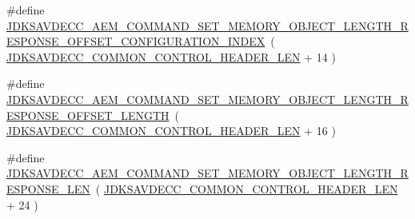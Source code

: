 \begin{DoxyCompactItemize}
\item 
\#define \hyperlink{group__command__set__memory__object__length__response_gaa06198d399f215f4a7f273be83b41e16}{J\+D\+K\+S\+A\+V\+D\+E\+C\+C\+\_\+\+A\+E\+M\+\_\+\+C\+O\+M\+M\+A\+N\+D\+\_\+\+S\+E\+T\+\_\+\+M\+E\+M\+O\+R\+Y\+\_\+\+O\+B\+J\+E\+C\+T\+\_\+\+L\+E\+N\+G\+T\+H\+\_\+\+R\+E\+S\+P\+O\+N\+S\+E\+\_\+\+O\+F\+F\+S\+E\+T\+\_\+\+C\+O\+N\+F\+I\+G\+U\+R\+A\+T\+I\+O\+N\+\_\+\+I\+N\+D\+EX}~( \hyperlink{group__jdksavdecc__avtp__common__control__header_gaae84052886fb1bb42f3bc5f85b741dff}{J\+D\+K\+S\+A\+V\+D\+E\+C\+C\+\_\+\+C\+O\+M\+M\+O\+N\+\_\+\+C\+O\+N\+T\+R\+O\+L\+\_\+\+H\+E\+A\+D\+E\+R\+\_\+\+L\+EN} + 14 )
\item 
\#define \hyperlink{group__command__set__memory__object__length__response_ga0b1a77e125f9bb1d16b576adb8bc8021}{J\+D\+K\+S\+A\+V\+D\+E\+C\+C\+\_\+\+A\+E\+M\+\_\+\+C\+O\+M\+M\+A\+N\+D\+\_\+\+S\+E\+T\+\_\+\+M\+E\+M\+O\+R\+Y\+\_\+\+O\+B\+J\+E\+C\+T\+\_\+\+L\+E\+N\+G\+T\+H\+\_\+\+R\+E\+S\+P\+O\+N\+S\+E\+\_\+\+O\+F\+F\+S\+E\+T\+\_\+\+L\+E\+N\+G\+TH}~( \hyperlink{group__jdksavdecc__avtp__common__control__header_gaae84052886fb1bb42f3bc5f85b741dff}{J\+D\+K\+S\+A\+V\+D\+E\+C\+C\+\_\+\+C\+O\+M\+M\+O\+N\+\_\+\+C\+O\+N\+T\+R\+O\+L\+\_\+\+H\+E\+A\+D\+E\+R\+\_\+\+L\+EN} + 16 )
\item 
\#define \hyperlink{group__command__set__memory__object__length__response_gaa96d65ba1f96e254f46f0bf883ff9525}{J\+D\+K\+S\+A\+V\+D\+E\+C\+C\+\_\+\+A\+E\+M\+\_\+\+C\+O\+M\+M\+A\+N\+D\+\_\+\+S\+E\+T\+\_\+\+M\+E\+M\+O\+R\+Y\+\_\+\+O\+B\+J\+E\+C\+T\+\_\+\+L\+E\+N\+G\+T\+H\+\_\+\+R\+E\+S\+P\+O\+N\+S\+E\+\_\+\+L\+EN}~( \hyperlink{group__jdksavdecc__avtp__common__control__header_gaae84052886fb1bb42f3bc5f85b741dff}{J\+D\+K\+S\+A\+V\+D\+E\+C\+C\+\_\+\+C\+O\+M\+M\+O\+N\+\_\+\+C\+O\+N\+T\+R\+O\+L\+\_\+\+H\+E\+A\+D\+E\+R\+\_\+\+L\+EN} + 24 )
\end{DoxyCompactItemize}
